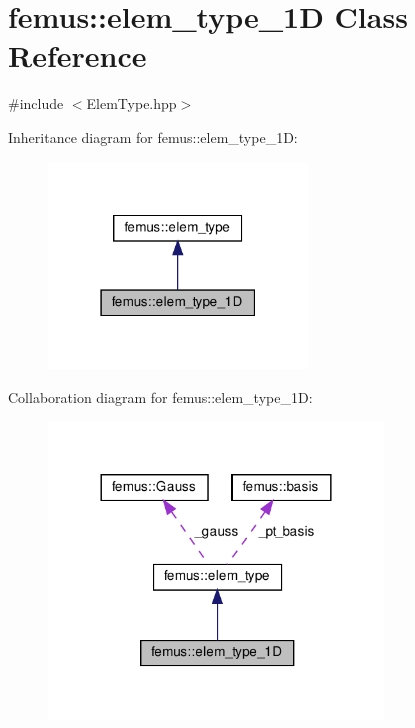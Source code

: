 \hypertarget{classfemus_1_1elem__type__1_d}{}\section{femus\+:\+:elem\+\_\+type\+\_\+1D Class Reference}
\label{classfemus_1_1elem__type__1_d}


{\ttfamily \#include $<$Elem\+Type.\+hpp$>$}



Inheritance diagram for femus\+:\+:elem\+\_\+type\+\_\+1D\+:
\nopagebreak
\begin{figure}[H]
\begin{center}
\leavevmode
\includegraphics[width=195pt]{classfemus_1_1elem__type__1_d__inherit__graph}
\end{center}
\end{figure}


Collaboration diagram for femus\+:\+:elem\+\_\+type\+\_\+1D\+:
\nopagebreak
\begin{figure}[H]
\begin{center}
\leavevmode
\includegraphics[width=252pt]{classfemus_1_1elem__type__1_d__coll__graph}
\end{center}
\end{figure}
